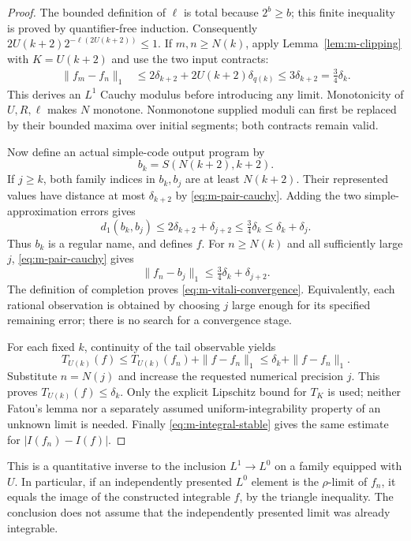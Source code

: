 \begin{proof}
The bounded definition of $\ell$ is total because $2^b\ge b$; this finite
inequality is proved by quantifier-free induction.  Consequently
$2U(k+2)2^{-\ell(2U(k+2))}\le1$.  If $m,n\ge N(k)$, apply
Lemma~\ref{lem:m-clipping} with $K=U(k+2)$ and use the two input contracts:
\begin{align}
 \|f_m-f_n\|_1
 &\le2\delta_{k+2}+2U(k+2)\delta_{q(k)}
 \le3\delta_{k+2}=\tfrac34\delta_k.
 \label{eq:m-pair-cauchy}
\end{align}
This derives an $L^1$ Cauchy modulus before introducing any limit.
Monotonicity of $U,R,\ell$ makes $N$ monotone.  Nonmonotone supplied
moduli can first be replaced by their bounded maxima over initial
segments; both contracts remain valid.

Now define an actual simple-code output program by
\begin{equation}
 b_k=S(N(k+2),k+2).
 \label{eq:m-output-name}
\end{equation}
If $j\ge k$, both family indices in $b_k,b_j$ are at least $N(k+2)$.
Their represented values have distance at most $\delta_{k+2}$ by
\eqref{eq:m-pair-cauchy}.  Adding the two simple-approximation errors gives
\[
 d_1(b_k,b_j)\le2\delta_{k+2}+\delta_{j+2}
              \le\tfrac34\delta_k\le\delta_k+\delta_j.
\]
Thus $b_k$ is a regular name, and defines $f$.  For $n\ge N(k)$ and
all sufficiently large $j$, \eqref{eq:m-pair-cauchy} gives
\[
 \|f_n-b_j\|_1\le\tfrac34\delta_k+\delta_{j+2}.
\]
The definition of completion proves \eqref{eq:m-vitali-convergence}.
Equivalently, each rational observation is obtained by choosing $j$ large
enough for its specified remaining error; there is no search for a
convergence stage.

For each fixed $k$, continuity of the tail observable yields
\[
 T_{U(k)}(f)\le T_{U(k)}(f_n)+\|f-f_n\|_1
             \le\delta_k+\|f-f_n\|_1.
\]
Substitute $n=N(j)$ and increase the requested numerical precision $j$.
This proves $T_{U(k)}(f)\le\delta_k$.  Only the explicit Lipschitz bound
for $T_K$ is used; neither Fatou's lemma nor a separately assumed
uniform-integrability property of an unknown limit is needed.
Finally \eqref{eq:m-integral-stable} gives the same estimate for
$|I(f_n)-I(f)|$.
\end{proof}

This is a quantitative inverse to the inclusion $L^1\to L^0$ on a family
equipped with $U$.  In particular, if an independently presented
$L^0$ element is the $\rho$-limit of $f_n$, it equals the image of the
constructed integrable $f$, by the triangle inequality.  The conclusion
does not assume that the independently presented limit was already
integrable.

